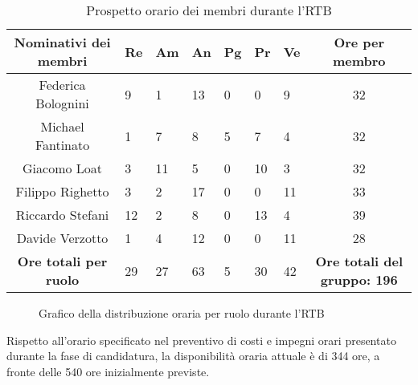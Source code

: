 \begin{table}[h!]
    \centering
    \renewcommand{\arraystretch}{1.5}
    \begin{tabularx}{\textwidth}{|c|X|X|X|X|X|X|c|}\hline
    \rowcolor[HTML]{FFD700} 
    \textbf{Nominativi dei membri} & \textbf{Re} & \textbf{Am} & \textbf{An} & \textbf{Pg} & \textbf{Pr} & \textbf{Ve} & \textbf{Ore per membro} \\ \hline
    Federica Bolognini & 9 & 1 & 13 & 0 & 0 & 9 & 32  \\ \hline
    Michael Fantinato  & 1 & 7 & 8 & 5 & 7 & 4 & 32  \\ \hline
    Giacomo Loat       & 3 & 11 & 5 & 0 & 10 & 3 & 32 \\ \hline
    Filippo Righetto   & 3 & 2 & 17 & 0 & 0 & 11 & 33  \\ \hline
    Riccardo Stefani   & 12 & 2 & 8 & 0 & 13 & 4 & 39 \\ \hline
    Davide Verzotto    & 1 & 4 & 12 & 0 & 0 & 11 & 28  \\ \hline
    \rowcolor[HTML]{FFD700} 
    \textbf{Ore totali per ruolo} & 29 & 27 & 63 & 5 & 30 & 42 & \textbf{Ore totali del gruppo: 196} \\ \hline
    \end{tabularx}
    \caption{Prospetto orario dei membri durante l’RTB}
\end{table}

\begin{figure}[htbp]
    \centering
    \caption{Grafico della distribuzione oraria per ruolo durante l’RTB}
\end{figure}

Rispetto all’orario specificato nel preventivo di costi e impegni orari presentato durante la fase di candidatura, la disponibilità oraria attuale è di 344 ore, a fronte delle 540 ore inizialmente previste.

